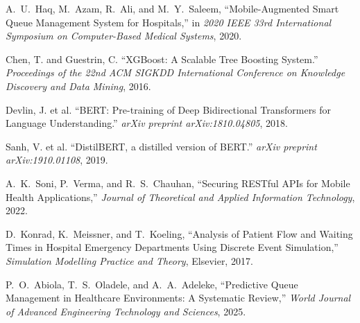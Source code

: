 \documentclass[12pt,a4paper]{article}
\begin{document}
\begin{enumerate}[label={[\arabic*]}]
\item A.~U.~Haq, M.~Azam, R.~Ali, and M.~Y.~Saleem, ``Mobile-Augmented Smart Queue Management System for Hospitals,'' in \textit{2020 IEEE 33rd International Symposium on Computer-Based Medical Systems}, 2020.
\item Chen, T. and Guestrin, C. ``XGBoost: A Scalable Tree Boosting System.'' \textit{Proceedings of the 22nd ACM SIGKDD International Conference on Knowledge Discovery and Data Mining}, 2016.
\item Devlin, J. et al. ``BERT: Pre-training of Deep Bidirectional Transformers for Language Understanding.'' \textit{arXiv preprint arXiv:1810.04805}, 2018.
\item Sanh, V. et al. ``DistilBERT, a distilled version of BERT.'' \textit{arXiv preprint arXiv:1910.01108}, 2019.
\item A.~K.~Soni, P.~Verma, and R.~S.~Chauhan, ``Securing RESTful APIs for Mobile Health Applications,'' \textit{Journal of Theoretical and Applied Information Technology}, 2022.
\item D.~Konrad, K.~Meissner, and T.~Koeling, ``Analysis of Patient Flow and Waiting Times in Hospital Emergency Departments Using Discrete Event Simulation,'' \textit{Simulation Modelling Practice and Theory}, Elsevier, 2017.
\item P.~O.~Abiola, T.~S.~Oladele, and A.~A.~Adeleke, ``Predictive Queue Management in Healthcare Environments: A Systematic Review,'' \textit{World Journal of Advanced Engineering Technology and Sciences}, 2025.
\end{enumerate}
\end{document}
